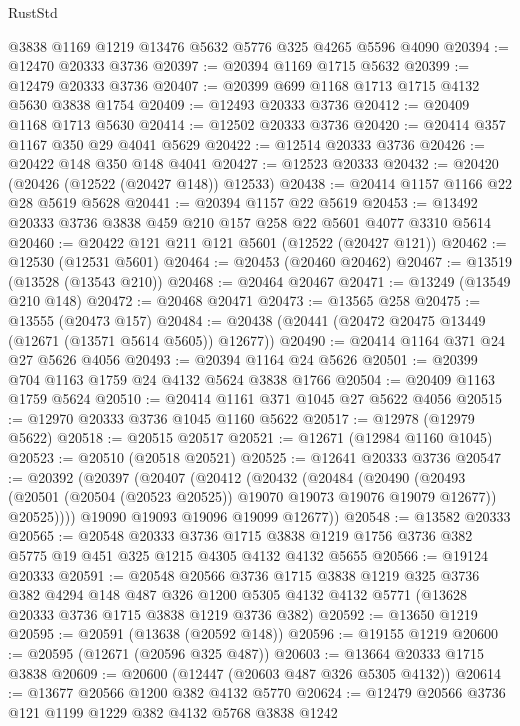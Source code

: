 \begin{lexlean}{RustStd}
\begin{coremodule}
    @3838
    @1169
    @1219
    @13476
    @5632
    @5776
    @325
    @4265
    @5596
    @4090
@20394 := @12470 @20333 @3736
@20397 := @20394 @1169 @1715 @5632
@20399 := @12479 @20333 @3736
@20407 := @20399 @699 @1168 @1713 @1715 @4132 @5630 @3838 @1754
@20409 := @12493 @20333 @3736
@20412 := @20409 @1168 @1713 @5630
@20414 := @12502 @20333 @3736
@20420 := @20414 @357 @1167 @350 @29 @4041 @5629
@20422 := @12514 @20333 @3736
@20426 := @20422 @148 @350 @148 @4041
@20427 := @12523 @20333
@20432 := @20420 (@20426 (@12522 (@20427 @148)) @12533)
@20438 := @20414 @1157 @1166 @22 @28 @5619 @5628
@20441 := @20394 @1157 @22 @5619
@20453 := @13492 @20333 @3736 @3838 @459 @210 @157 @258 @22 @5601 @4077 @3310 @5614
@20460 := @20422 @121 @211 @121 @5601 (@12522 (@20427 @121))
@20462 := @12530 (@12531 @5601)
@20464 := @20453 (@20460 @20462)
@20467 := @13519 (@13528 (@13543 @210))
@20468 := @20464 @20467
@20471 := @13249 (@13549 @210 @148)
@20472 := @20468 @20471
@20473 := @13565 @258
@20475 := @13555 (@20473 @157)
@20484 := @20438 (@20441 (@20472 @20475 @13449 (@12671 (@13571 @5614 @5605)) @12677))
@20490 := @20414 @1164 @371 @24 @27 @5626 @4056
@20493 := @20394 @1164 @24 @5626
@20501 := @20399 @704 @1163 @1759 @24 @4132 @5624 @3838 @1766
@20504 := @20409 @1163 @1759 @5624
@20510 := @20414 @1161 @371 @1045 @27 @5622 @4056
@20515 := @12970 @20333 @3736 @1045 @1160 @5622
@20517 := @12978 (@12979 @5622)
@20518 := @20515 @20517
@20521 := @12671 (@12984 @1160 @1045)
@20523 := @20510 (@20518 @20521)
@20525 := @12641 @20333 @3736
@20547 := @20392
    (@20397
      (@20407
        (@20412
          (@20432
            (@20484
              (@20490
                (@20493 (@20501 (@20504 (@20523 @20525)) @19070 @19073 @19076 @19079 @12677))
                @20525))))
        @19090
        @19093
        @19096
        @19099
        @12677))
@20548 := @13582 @20333
@20565 := @20548
    @20333
    @3736
    @1715
    @3838
    @1219
    @1756
    @3736
    @382
    @5775
    @19
    @451
    @325
    @1215
    @4305
    @4132
    @4132
    @5655
@20566 := @19124 @20333
@20591 := @20548
    @20566
    @3736
    @1715
    @3838
    @1219
    @325
    @3736
    @382
    @4294
    @148
    @487
    @326
    @1200
    @5305
    @4132
    @4132
    @5771
    (@13628 @20333 @3736 @1715 @3838 @1219 @3736 @382)
@20592 := @13650 @1219
@20595 := @20591 (@13638 (@20592 @148))
@20596 := @19155 @1219
@20600 := @20595 (@12671 (@20596 @325 @487))
@20603 := @13664 @20333 @1715 @3838
@20609 := @20600 (@12447 (@20603 @487 @326 @5305 @4132))
@20614 := @13677 @20566 @1200 @382 @4132 @5770
@20624 := @12479 @20566 @3736 @121 @1199 @1229 @382 @4132 @5768 @3838 @1242

\end{coremodule}
\end{lexlean}

